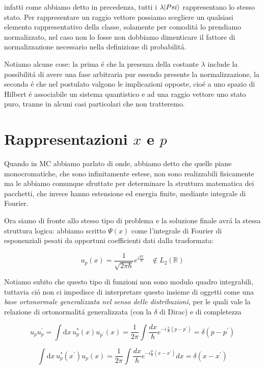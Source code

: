 infatti come abbiamo detto in precedenza, tutti i $\lambda \normalsize| Psi \normalsize\rangle$ rappresentano lo stesso stato. Per rappresentare un raggio vettore possiamo scegliere un qualsiasi elemento rappresentativo della classe, solamente per comodit\'a lo prendiamo normalizzato, nel caso non lo fosse non dobbiamo dimenticare il fattore di normalizzazione necessario nella definizione di probabilit\'a.

Notiamo alcune cose: la prima \'e che la presenza della costante $\lambda$ include la possibilit\'a di avere una fase arbitraria pur essendo presente la normalizzazione, la seconda \'e che nel postulato valgono le implicazioni opposte, cio\'e a uno spazio di Hilbert \'e associabile un sistema quantistico e ad una raggio vettore uno stato puro, tranne in alcuni casi particolari che non tratteremo.


\chapter{\textbf{Rappresentazioni $x$ e $p$}}

Quando in MC abbiamo parlato di onde, abbiamo detto che quelle piane monocromatiche, che sono infinitamente estese, non sono realizzabili fisicamente ma le abbiamo comunque sfruttate per determinare la struttura matematica dei pacchetti, che invece hanno estensione ed energia finite, mediante integrale di Fourier.

Ora siamo di fronte allo stesso tipo di problema e la soluzione finale avr\'a la stessa struttura logica: abbiamo scritto $\Psi(x)$ come l'integrale di Fourier di esponenziali pesati da opportuni coefficienti dati dalla trasformata:

$$u_{p}(x)={\frac{1}{\sqrt{2\pi\hbar}}}e^{i{\frac{p x}{\hbar}}}\ \ \ \ \notin L_{2}(\mathbb{R})$$

Notiamo subito che questo tipo di funzioni non sono modulo quadro integrabili, tuttavia ci\'o non ci impedisce di interpretare questo insieme di oggetti come una \textit{base ortonormale generalizzata nel senso delle distribuzioni}, per le quali vale la relazione di ortonormalit\'a generalizzata (con la $\delta$ di Dirac) e di completezza

$$u_{p}u_{p}^{\prime}=\int\mathrm{d}x\,u_{p}^{*}(x)u_{p^{\prime}}(x)=\frac{1}{2\pi}\int\frac{d x}{\hbar}e^{-i\,\frac{x}{\hbar}(p-p^{\prime})}=\delta(p-p^{\prime})$$

$$\int\mathrm{d}x\,u_{p}^{*}(x^{\prime})u_{p}(x)=\frac{1}{2\pi}\int\frac{d x}{\hbar}e^{-i\frac{p}{\hbar}(x-x^{\prime})}d x=\delta(x-x^{\prime})$$

